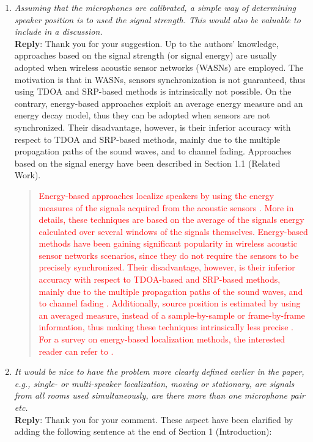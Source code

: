 \documentclass[11pt, technote, letterpaper, oneside, onecolumn]{IEEEtran}
\begin{document}
\begin{enumerate}
\item \textit{Assuming that the microphones are calibrated, a simple way of determining speaker position is to used the signal strength. This would also be valuable to include in a discussion.\\}
\textbf{Reply}: Thank you for your suggestion. Up to the authors' knowledge, approaches based on the signal strength (or signal energy) are usually adopted when wireless acoustic sensor networks (WASNs) are employed. The motivation is that in WASNs, sensors synchronization is not guaranteed, thus using TDOA and SRP-based methods is intrinsically not possible. On the contrary, energy-based approaches exploit an average energy measure and an energy decay model, thus they can be adopted when sensors are not synchronized. Their disadvantage, however, is their inferior accuracy with respect to TDOA and SRP-based methods, mainly due to the multiple propagation paths of the sound waves, and to channel fading. Approaches based on the signal energy have been described in Section 1.1 (Related Work). 

\begin{quote}
\textcolor{red}{
Energy-based approaches localize speakers by using the energy measures of the signals acquired from the acoustic sensors \cite{Cobos2017,Meng2017}. More in details, these techniques are based on the average of the signals energy calculated over several windows of the signals themselves. Energy-based methods have been gaining significant popularity in wireless acoustic sensor networks scenarios, since they do not require the sensors to be precisely synchronized. Their disadvantage, however, is their inferior accuracy with respect to TDOA-based and SRP-based methods, mainly due to the multiple propagation paths of the sound waves, and to channel fading \cite{Cobos2017}. Additionally, source position is estimated by using an averaged measure, instead of a sample-by-sample or frame-by-frame information, thus making these techniques intrinsically less precise \cite{Cobos2017}. For a survey on energy-based localization methods, the interested reader can refer to \cite{Cobos2017,Meng2017}.}
\end{quote}


\item \textit{It would be nice to have the problem more clearly defined earlier in the paper, e.g., single- or multi-speaker localization, moving or stationary, are signals from all rooms used simultaneously, are there more than one microphone pair etc.\\}
\textbf{Reply}: Thank you for your comment. These aspect have been clarified by adding the following sentence at the end of Section 1 (Introduction):


\end{enumerate}
\end{document}
